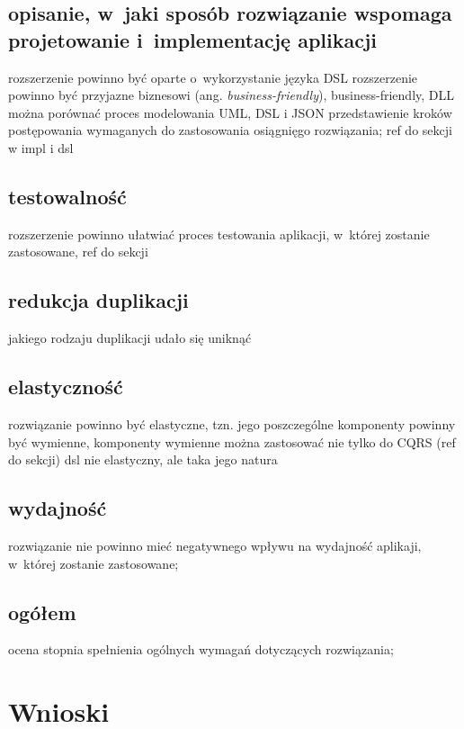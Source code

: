 \subsection{opisanie, w~jaki sposób rozwiązanie wspomaga projetowanie i~implementację aplikacji}

rozszerzenie powinno być oparte o~wykorzystanie języka DSL
rozszerzenie powinno być przyjazne biznesowi (ang. \emph{business-friendly}),
business-friendly, DLL
można porównać proces modelowania UML, DSL i JSON
przedstawienie kroków postępowania wymaganych do zastosowania osiągnięgo rozwiązania; ref do sekcji w impl i dsl

\subsection{testowalność}

rozszerzenie powinno ułatwiać proces testowania aplikacji, w~której zostanie zastosowane,
ref do sekcji


\subsection{redukcja duplikacji}

jakiego rodzaju duplikacji udało się uniknąć


\subsection{elastyczność}

rozwiązanie powinno być elastyczne, tzn. jego poszczególne komponenty powinny być wymienne,
komponenty wymienne
można zastosować nie tylko do CQRS (ref do sekcji)
dsl nie elastyczny, ale taka jego natura


\subsection{wydajność}

rozwiązanie nie powinno mieć negatywnego wpływu na wydajność aplikaji, w~której zostanie zastosowane;


\subsection{ogółem}

ocena stopnia spełnienia ogólnych wymagań dotyczących rozwiązania;



\section{Wnioski}

